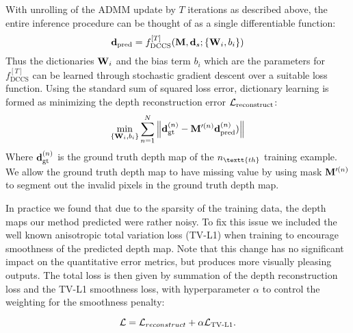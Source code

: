 With unrolling of the ADMM update by $T$ iterations as described above, the entire inference procedure can be thought of as a single differentiable function:
\begin{equation}
    \mathbf{d}_\text{pred} = f_\text{DCCS}^{[T]}(\mathbf{M}, \mathbf{d}_s; \{\mathbf{W}_i, b_i\})
\end{equation}
Thus the dictionaries $\mathbf{W}_i$ and the bias term $b_i$ which are the parameters for $f_\text{DCCS}^{[T]}$ can be learned through  stochastic gradient descent over a suitable loss function. Using the standard sum of squared loss error, dictionary learning is formed as minimizing the depth reconstruction error $\mathcal{L}_\text{reconstruct}$:
\begin{equation}
  \label{eq:9}
  \min_{\{\mathbf{W}_i, b_i\}} \sum_{n=1}^{N}\left\Vert \mathbf{d}_\text{gt}^{(n)} - \mathbf{M}'^{(n)}  \mathbf{d}_\text{pred}^{(n)})\right\Vert
\end{equation}
Where $\mathbf{d}_\text{gt}^{(n)}$ is the ground truth depth map of the $n_\textt{th}$ training example. We allow the ground truth depth map to have missing value by using mask $\mathbf{M}'^{(n)}$ to segment out the invalid pixels in the ground truth depth map. 

In practice we found that due to the sparsity of the training data, the depth maps our method predicted were rather noisy. To fix this issue we included the well known anisotropic total variation loss (TV-L1) when training to encourage smoothness of the predicted depth map. Note that this change has no significant impact on the quantitative error metrics, but produces more visually pleasing outputs. The total loss is then given by summation of the depth reconstruction loss and the TV-L1 smoothness loss, with hyperparameter $\alpha$ to control the weighting for the smoothness penalty:

\begin{equation}
  \label{eq:9}
  \mathcal{L} = \mathcal{L}_{reconstruct} + \alpha \mathcal{L}_\text{TV-L1}.
\end{equation}

